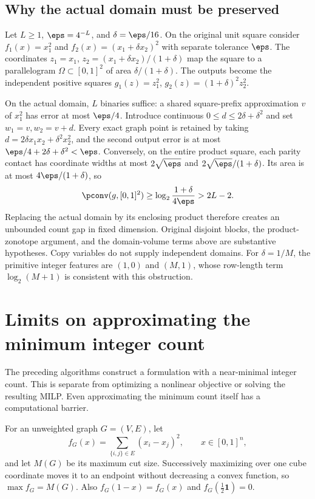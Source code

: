 \subsection{Why the actual domain must be preserved}

\begin{example}\label{ex:thin-domain}
Let $L\ge1$, $\eps=4^{-L}$, and $\delta=\eps/16$. On the original
unit square consider $f_1(x)=x_1^2$ and
$f_2(x)=(x_1+\delta x_2)^2$ with separate tolerance $\eps$. The coordinates
$z_1=x_1$, $z_2=(x_1+\delta x_2)/(1+\delta)$ map the square to a
parallelogram $\Omega\subset[0,1]^2$ of area $\delta/(1+\delta)$.
The outputs become the independent positive squares
$g_1(z)=z_1^2$, $g_2(z)=(1+\delta)^2z_2^2$.

On the actual domain, $L$ binaries suffice: a shared square-prefix
approximation $v$ of $x_1^2$ has error at most $\eps/4$. Introduce
continuous $0\le d\le2\delta+\delta^2$ and set $w_1=v,w_2=v+d$.
Every exact graph point is retained by taking
$d=2\delta x_1x_2+\delta^2x_2^2$, and the second output error is at
most $\eps/4+2\delta+\delta^2<\eps$. Conversely, on the entire product
square, each parity contact has coordinate widths at most
$2\sqrt\eps$ and $2\sqrt\eps/(1+\delta)$. Its area is at most
$4\eps/(1+\delta)$, so
\[
 \pconv(g,[0,1]^2)\ge\log_2\frac{1+\delta}{4\eps}>2L-2.
\]
Replacing the actual domain by its enclosing product therefore creates
an unbounded count gap in fixed dimension. Original disjoint blocks,
the product-zonotope argument, and the domain-volume terms above are
substantive hypotheses. Copy variables do not supply independent domains.
For $\delta=1/M$, the primitive integer features are $(1,0)$ and
$(M,1)$, whose row-length term $\log_2(M+1)$ is consistent with this
obstruction.
\end{example}

\section{Limits on approximating the minimum integer count}\label{sec:quadratic-hardness}

The preceding algorithms construct a formulation with a near-minimal
integer count. This is separate from optimizing a nonlinear objective
or solving the resulting MILP. Even approximating the minimum count
itself has a computational barrier.

For an unweighted graph $G=(V,E)$, let
\[
 f_G(x)=\sum_{\{i,j\}\in E}(x_i-x_j)^2,\qquad x\in[0,1]^n,
\]
and let $M(G)$ be its maximum cut size. Successively maximizing over
one cube coordinate moves it to an endpoint without decreasing a convex
function, so $\max f_G=M(G)$. Also $f_G(1-x)=f_G(x)$ and
$f_G(\frac12\mathbf1)=0$.


